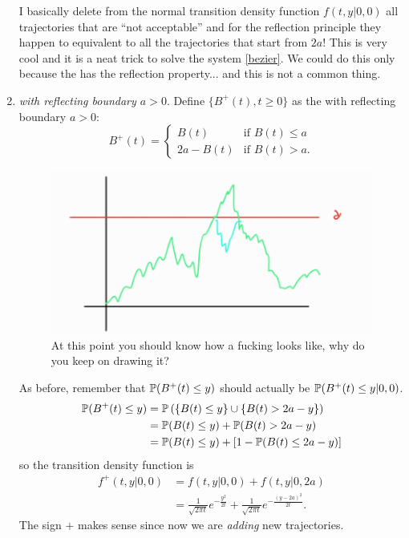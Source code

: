 \documentclass[12pt]{report}
\begin{document}
\begin{enumerate}
	I basically delete from the normal transition density function $f(t,y|0,0)$ all trajectories that are ``not acceptable'' and for the reflection principle they happen to equivalent to all the trajectories that start from $2a$! This is very cool and it is a neat trick to solve the system \ref{bezier}. We could do this only because the \bwm{} has the reflection property... and this is not a common thing.
	\item \textit{\bwm{} with reflecting boundary $a>0$}. Define $\{B^{+}(t),t\geq0\}$ as the \bwm{} with reflecting boundary $a>0$:
	\begin{equation*}
		B^{+}(t)=\begin{cases}
			B(t)&\text{if }B(t)\leq a\\
			2a-B(t)&\text{if }B(t)>a.
		\end{cases}
	\end{equation*}
	\begin{figure}[h]
		\centering
		\includegraphics[width=0.5\linewidth]{img/screenshot055}
		\caption{At this point you should know how a fucking \bwm{} looks like, why do you keep on drawing it?}
		\label{fig:screenshot055}
	\end{figure}
As before, remember that $\mathbb{P}(B^{+}(t)\leq y)$ should actually be $\mathbb{P}(B^{+}(t)\leq y|0,0)$.
\begin{align*}
	\mathbb{P}(B^{+}(t)\leq y)&=\mathbb{P}\left(\{B(t)\leq y\}\cup\{B(t)>2a-y\}\right)\\
	&=\mathbb{P}(B(t)\leq y)+\mathbb{P}(B(t)>2a-y)\\
	&=\mathbb{P}(B(t)\leq y)+[1-\mathbb{P}(B(t)\leq 2a-y)]
\end{align*}
so the transition density function is
\begin{align*}
	f^{+}(t,y|0,0)&=f(t,y|0,0)+f(t,y|0,2a)\\
	&=\frac{1}{\sqrt{2\pi t}}e^{-\frac{y^{2}}{2t}}+\frac{1}{\sqrt{2\pi t}}e^{-\frac{(y-2a)^{2}}{2t}}.
\end{align*}
The sign $+$ makes sense since now we are \textit{adding} new trajectories.
\end{enumerate}
\end{document}
